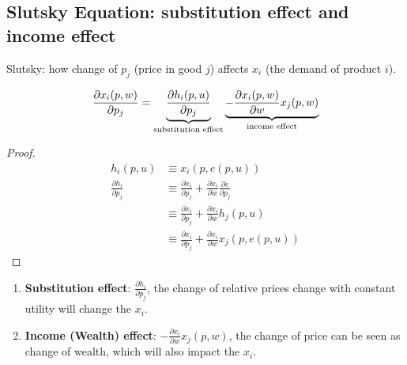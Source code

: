 \documentclass[11pt]{elegantbook}
\begin{document}
\subsection{Slutsky Equation: substitution effect and income effect}
Slutsky: how change of $p_j$ (price in good $j$) affects $x_i$ (the demand of product $i$).
\begin{proposition}
    \begin{equation}
        \begin{aligned}
            \frac{\partial x_i(p,w)}{\partial p_j}=\underbrace{\frac{\partial h_i(p,u)}{\partial p_j}}_{\textnormal{substitution effect}}\underbrace{-\frac{\partial x_i(p,w)}{\partial w} x_j(p,w)}_{\textnormal{income effect}}
        \end{aligned}
        \nonumber
    \end{equation}
\end{proposition}
\begin{proof}
    \begin{equation}
        \begin{aligned}
            h_i(p,u)&\equiv x_i(p,e(p,u))\\
            \frac{\partial h_{i}}{\partial p_{j}} & \equiv \frac{\partial x_{i}}{\partial p_{j}}+\frac{\partial x_{i}}{\partial w} \frac{\partial e}{\partial p_{j}} \\
            & \equiv \frac{\partial x_{i}}{\partial p_{j}}+\frac{\partial x_{i}}{\partial w} h_{j}(p, u) \\
            & \equiv \frac{\partial x_{i}}{\partial p_{j}}+\frac{\partial x_{i}}{\partial w} x_{j}(p, e(p,u))
        \end{aligned}
        \nonumber
    \end{equation}
\end{proof}
\begin{enumerate}[$\circ$]
    \item \textbf{Substitution effect}: $\frac{\partial h_{i}}{\partial p_{j}}$, the change of relative prices change with constant utility will change the $x_i$.
    \item \textbf{Income (Wealth) effect}: $-\frac{\partial x_{i}}{\partial w} x_{j}(p, w)$, the change of price can be seen as change of wealth, which will also impact the $x_i$.
\end{enumerate}
\end{document}
